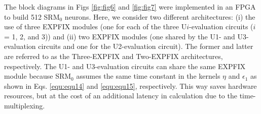 \documentclass[10pt,journal]{IEEEtran}
\begin{document}
The block diagrams in Figs \ref{fig:fig6} and \ref{fig:fig7} were implemented in an FPGA to build 512 SRM$_\textrm{0}$ neurons. 
Here, we consider two different architectures: (i) the use of three EXP\textunderscore FIX modules (one for each of the three U$i$-evaluation circuits ($i$ = 1, 2, and 3)) and (ii) two EXP\textunderscore FIX modules (one shared by the U1- and U3-evaluation circuits and one for the U2-evaluation circuit). 
The former and latter are referred to as the Three-EXP\textunderscore FIX and Two-EXP\textunderscore FIX architectures, respectively. 
The U1- and U3-evaluation circuits can share the same EXP\textunderscore FIX module because SRM$_\textrm{0}$ assumes the same time constant in the kernels $\eta$ and $\epsilon_\textrm{1}$ as shown in Eqs. \eqref{equ:equ14} and \eqref{equ:equ15}, respectively. 
This way saves hardware resources, but at the cost of an additional latency in calculation due to the time-multiplexing.
\end{document}
